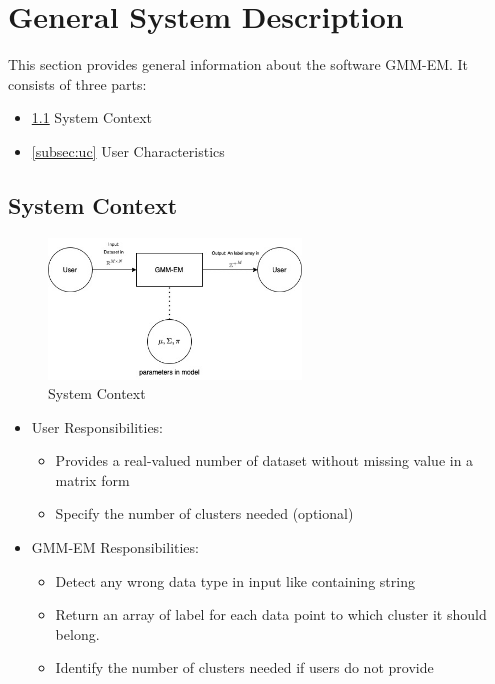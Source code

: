 \documentclass[12pt]{article}
\begin{document}
\section{General System Description}
\label{sec:gsd}
This section provides general information about the software GMM-EM. It consists of three parts:
\begin{itemize}
    \item \ref{subsec:sct} System Context
    \item \ref{subsec:uc}  User Characteristics
\end{itemize}

\subsection{System Context}
\label{subsec:sct}
\begin{figure}[h!]
\begin{center}
 \includegraphics[width=0.6\textwidth]{system_context.jpg}
\caption{System Context}
\label{Fig_SystemContext} 
\end{center}
\end{figure}



\begin{itemize}
\item User Responsibilities:
\begin{itemize}
\item Provides a real-valued number of dataset without missing value in a matrix form
\item Specify the number of clusters needed (optional)
\end{itemize}
\item \progname{} GMM-EM Responsibilities:
\begin{itemize}
\item Detect any wrong data type in input like containing string
\item Return an array of label for each data point to which cluster it should belong. 
\item Identify the number of clusters needed if users do not provide 
\end{itemize}
\end{itemize}
\end{document}
